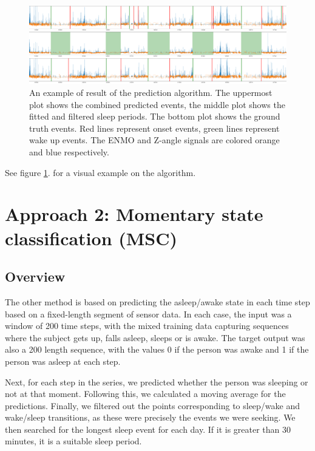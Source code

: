 \documentclass{article}
\begin{document}
\begin{figure}
    \centering
    \includegraphics[width=\textwidth]{cpd_prediction_plot.png}
    \caption{An example of result of the prediction algorithm. The uppermost plot shows the combined predicted events, the middle plot shows the fitted and filtered sleep periods. The bottom plot shows the ground truth events. Red lines represent onset events, green lines represent wake up events. The ENMO and Z-angle signals are colored orange and blue respectively.}
    \label{fig:cpd-prediction-algorithm}
\end{figure}

See figure \ref{fig:cpd-prediction-algorithm}. for a visual example on the algorithm.

\section{Approach 2: Momentary state classification (MSC)}

\subsection{Overview}

The other method is based on predicting the asleep/awake state in each time step based on a fixed-length segment of sensor data. In each case, the input was a window of 200 time steps, with the mixed training data capturing sequences where the subject gets up, falls asleep, sleeps or is awake. The target output was also a 200 length sequence, with the values 0 if the person was awake and 1 if the person was asleep at each step.

Next, for each step in the series, we predicted whether the person was sleeping or not at that moment. Following this, we calculated a moving average for the predictions. Finally, we filtered out the points corresponding to sleep/wake and wake/sleep transitions, as these were precisely the events we were seeking. We then searched for the longest sleep event for each day. If it is greater than 30 minutes, it is a suitable sleep period.
\end{document}
